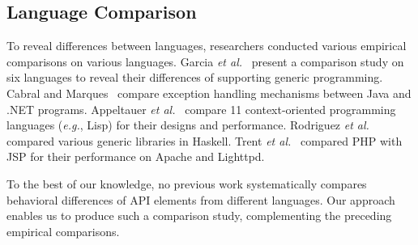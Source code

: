 \subsection{Language Comparison} To reveal differences between languages, researchers conducted various empirical comparisons on various languages. Garcia \emph{et al.}~\citep{Garcia2003} present a comparison study on six languages to reveal their differences of supporting generic programming. Cabral and Marques~\citep{cabral2007exception} compare exception handling mechanisms between Java and .NET programs. Appeltauer \emph{et al.}~\citep{appeltauer2009comparison} compare 11 context-oriented programming languages (\emph{e.g.}, Lisp) for their designs and performance. Rodriguez \emph{et al.}~\citep{yakushevcomparing} compared various generic libraries in Haskell. Trent \emph{et al.}~\citep{trent2008performance} compared PHP with JSP for their performance on Apache and Lighttpd. 

To the best of our knowledge, no previous work systematically compares behavioral differences of API elements from different languages. Our approach enables us to produce such a comparison study, complementing the preceding empirical comparisons.


